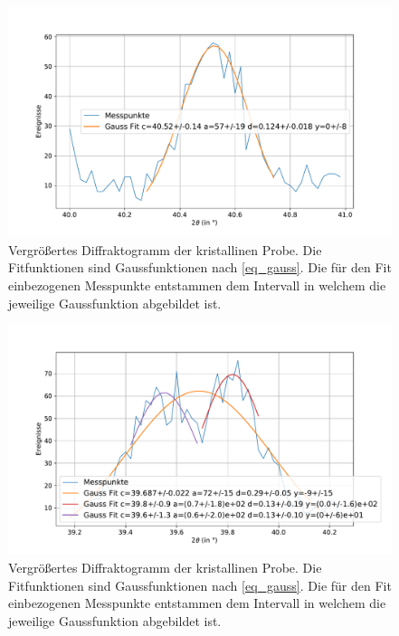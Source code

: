 \documentclass[
	a4paper,
	12pt,
	pagesize,
	ngerman
]{scrartcl}
\begin{document}
	\begin{figure}[H]
			\includegraphics[width=\linewidth]{img/XRD_Kristallin_40,5_0,5.pdf}
			\caption{
				Vergrößertes Diffraktogramm der kristallinen Probe.
				Die Fitfunktionen sind Gaussfunktionen nach \cref{eq_gauss}.
				Die für den Fit einbezogenen Messpunkte entstammen dem Intervall in welchem die jeweilige Gaussfunktion abgebildet ist.
				}
			\label{fig_xrd_kristall_3}
	\end{figure}
	\begin{figure}[H]
			\includegraphics[width=\linewidth]{img/XRD_Kristallin_39,76_0,5.pdf}
			\caption{
				Vergrößertes Diffraktogramm der kristallinen Probe.
				Die Fitfunktionen sind Gaussfunktionen nach \cref{eq_gauss}.
				Die für den Fit einbezogenen Messpunkte entstammen dem Intervall in welchem die jeweilige Gaussfunktion abgebildet ist.
				}
			\label{fig_xrd_kristall_4}
	\end{figure}
\end{document}
